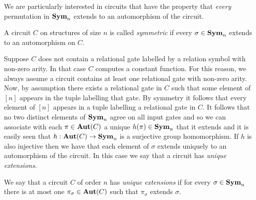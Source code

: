 \documentclass[a4paper,UKenglish]{lipics-v2018}
\begin{document}
We are particularly interested in circuits that have the property that
\emph{every} permutation in $\text{\textbf{Sym}}_n$ extends to an automorphism of the circuit.

\begin{definition}[Symmetry]
  A circuit $C$ on structures of size $n$ is called \emph{symmetric} if every
  $\sigma \in \text{\textbf{Sym}}_n$ extends to an automorphism on $C$.
\end{definition}

Suppose $C$ does not contain a relational gate labelled by a relation symbol
with non-zero arity. In that case $C$ computes a constant function. For this
reason, we always assume a circuit contains at least one relational gate with
non-zero arity. Now, by assumption there exists a relational gate in $C$ such
that some element of $[n]$ appears in the tuple labelling that gate. By symmetry
it follows that every element of $[n]$ appears in a tuple labelling a relational
gate in $C$. It follows that no two distinct elements of $\text{\textbf{Sym}}_n$ agree on all
input gates and so we can associate with each $\pi \in \text{\textbf{Aut}}(C)$ a unique $h(\pi)
\in \text{\textbf{Sym}}_n$ that it extends and it is easily seen that $h: \text{\textbf{Aut}}(C) \rightarrow \text{\textbf{Sym}}_n$
is a surjective group homomorphism. If $h$ is also injective then we have that
each element of $\sigma$ extends uniquely to an automorphism of the circuit. In
this case we say that a circuit has \emph{unique extensions}.


\begin{definition}
  We say that a circuit $C$ of order $n$ has \emph{unique extensions} if for
  every $\sigma \in \text{\textbf{Sym}}_n$ there is at most one $\pi_{\sigma} \in \text{\textbf{Aut}}(C)$ such
  that $\pi_{\sigma}$ extends $\sigma$.
\end{definition}
\end{document}
